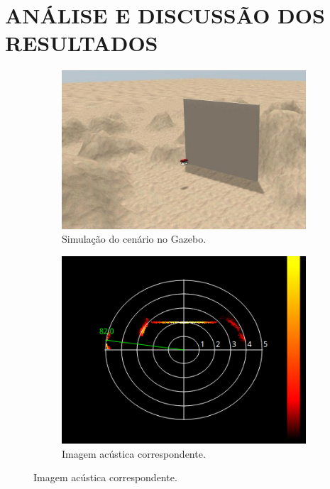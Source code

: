 
\chapter{ANÁLISE E DISCUSSÃO DOS RESULTADOS}
\label{sec:resultados}

\begin{figure}[H]
    \centering
    \caption{Imagem acústica do sonar gerada em um ambiente de simulação.}
    \label{fig:imagem_gpu_msis}
    \begin{subfigure}[t]{0.5\textwidth}
        \includegraphics[width=\textwidth]{dados/figuras/wall2.jpg}
        \caption{Simulação do cenário no Gazebo.}
    \end{subfigure}
    \begin{subfigure}[t]{0.42\textwidth}
        \includegraphics[width=\textwidth]{dados/figuras/heightmap_wall.png}
        \caption{Imagem acústica correspondente.}
    \end{subfigure}
\end{figure}